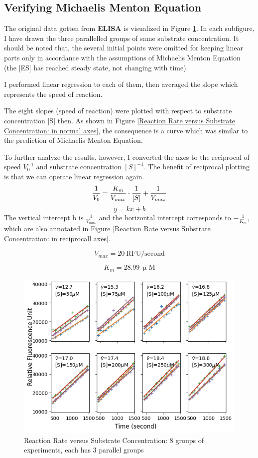\documentclass{report}
\begin{document}
\subsection{Verifying Michaelis Menton Equation}
The original data gotten from \textbf{ELISA} is visualized in Figure \ref{Reaction Rate versus Substrate Concentration: 8 groups of experiments}.
In each subfigure, I have drawn the three parallelled groups of same substrate concentration.
It should be noted that, the several initial points were omitted for keeping linear parts only in accordance with the assumptions of Michaelis Menton Equation (the [ES] has reached steady state, not changing with time).

I performed linear regression to each of them, then averaged the slope which represents the speed of reaction.

The eight slopes (speed of reaction) were plotted with respect to substrate concentration [S] then.
As shown in Figure \ref{Reaction Rate versus Substrate Concentration: in normal axes}, the consequence is a curve which was similar to the prediction of Michaelis Menton Equation.

To further analyze the results, however, I converted the axes to the reciprocal of speed $V_0^{-1}$ and substrate concentration $[S]^{-1}$.
The benefit of reciprocal plotting is that we can operate linear regression again.
$$
\frac{1}{V_0}=\frac{K_m}{V_{max}}\cdot \frac{1}{[S]}+\frac{1}{V_{max}}\\
$$
$$
y=kx+b
$$
The vertical intercept b is $\frac{1}{V_{max}}$ and the horizontal intercept corresponds to $-\frac{1}{K_m}$, which are also annotated in Figure \ref{Reaction Rate versus Substrate Concentration: in reciprocall axes}.

$$
V_{max}=20 \ \text{RFU/second}
$$

$$
K_{m}=28.99 \ \upmu \text{M}
$$


\begin{figure}
    \centering
    \includegraphics[width=0.5\linewidth]{../Figures/substrate1.png}
    \caption{Reaction Rate versus Substrate Concentration: 8 groups of experiments, each has 3 parallel groups}
    \label{Reaction Rate versus Substrate Concentration: 8 groups of experiments}
\end{figure}
\end{document}
